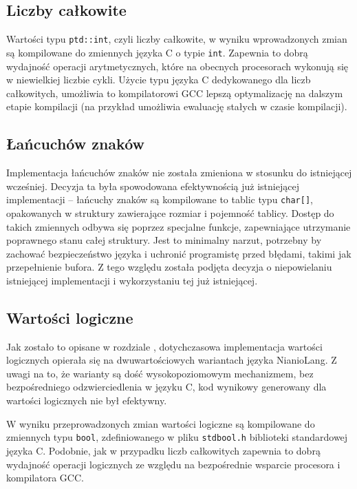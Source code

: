 \documentclass[licencjacka]{pracamgr}
\begin{document}
\subsection{Liczby całkowite}
Wartości typu \texttt{ptd::int}, czyli liczby całkowite, w wyniku wprowadzonych zmian są kompilowane
do zmiennych języka C o typie \texttt{int}. Zapewnia to dobrą wydajność operacji arytmetycznych,
które na obecnych procesorach wykonują się w niewielkiej liczbie cykli. Użycie typu języka C
dedykowanego dla liczb całkowitych, umożliwia to kompilatorowi GCC lepszą optymalizację
na dalszym etapie kompilacji (na przykład umożliwia ewaluację stałych w czasie kompilacji).
\subsection{Łańcuchów znaków}
Implementacja łańcuchów znaków nie została zmieniona w stosunku do istniejącej wcześniej.
Decyzja ta była spowodowana efektywnością już istniejącej implementacji -- łańcuchy znaków
są kompilowane to tablic typu \texttt{char[]}, opakowanych w struktury zawierające
rozmiar i pojemność tablicy. Dostęp do takich zmiennych odbywa się poprzez specjalne funkcje,
zapewniające utrzymanie poprawnego stanu całej struktury. Jest to minimalny narzut, potrzebny by
zachować bezpieczeństwo języka i uchronić programistę przed błędami, takimi jak przepełnienie bufora.
Z tego względu została podjęta decyzja o niepowielaniu istniejącej implementacji i wykorzystaniu
tej już istniejącej.
\subsection{Wartości logiczne}
Jak zostało to opisane w rozdziale \textit{}, dotychczasowa implementacja
wartości logicznych opierała się na dwuwartościowych wariantach
języka NianioLang. Z uwagi na to, że warianty są dość wysokopoziomowym mechanizmem, bez
bezpośredniego odzwierciedlenia w języku C, kod wynikowy generowany dla wartości logicznych nie był
efektywny.

W wyniku przeprowadzonych zmian wartości logiczne są kompilowane do zmiennych typu \texttt{bool},
zdefiniowanego w pliku \texttt{stdbool.h} biblioteki standardowej języka C.
Podobnie, jak w przypadku liczb całkowitych zapewnia to dobrą wydajność operacji logicznych
ze względu na bezpośrednie wsparcie procesora i kompilatora GCC.
\end{document}
